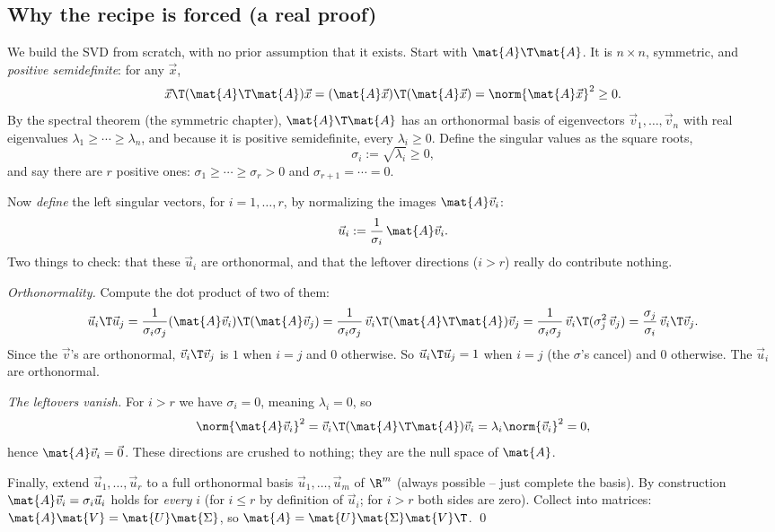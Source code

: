 \subsection{Why the recipe is forced (a real proof)}

We build the SVD from scratch, with no prior assumption that it exists. Start with
$\mat{A}\T\mat{A}$. It is $n\times n$, symmetric, and \emph{positive
semidefinite}: for any $\vec{x}$,
\[
  \vec{x}\T(\mat{A}\T\mat{A})\vec{x} = (\mat{A}\vec{x})\T(\mat{A}\vec{x})
  = \norm{\mat{A}\vec{x}}^2 \ge 0.
\]
By the spectral theorem (the symmetric chapter), $\mat{A}\T\mat{A}$ has an
orthonormal basis of eigenvectors $\vec{v}_1,\dots,\vec{v}_n$ with real
eigenvalues $\lambda_1 \ge \cdots \ge \lambda_n$, and because it is positive
semidefinite, every $\lambda_i \ge 0$. Define the singular values as the
square roots,
\[
  \sigma_i := \sqrt{\lambda_i} \ge 0,
\]
and say there are $r$ positive ones: $\sigma_1 \ge \cdots \ge \sigma_r > 0$ and
$\sigma_{r+1} = \cdots = 0$.

Now \emph{define} the left singular vectors, for $i = 1,\dots,r$, by normalizing
the images $\mat{A}\vec{v}_i$:
\[
  \vec{u}_i := \frac{1}{\sigma_i}\,\mat{A}\vec{v}_i.
\]
Two things to check: that these $\vec{u}_i$ are orthonormal, and that the leftover
directions ($i > r$) really do contribute nothing.

\emph{Orthonormality.} Compute the dot product of two of them:
\[
  \vec{u}_i\T\vec{u}_j
  = \frac{1}{\sigma_i\sigma_j}(\mat{A}\vec{v}_i)\T(\mat{A}\vec{v}_j)
  = \frac{1}{\sigma_i\sigma_j}\,\vec{v}_i\T(\mat{A}\T\mat{A})\vec{v}_j
  = \frac{1}{\sigma_i\sigma_j}\,\vec{v}_i\T(\sigma_j^2\,\vec{v}_j)
  = \frac{\sigma_j}{\sigma_i}\,\vec{v}_i\T\vec{v}_j.
\]
Since the $\vec{v}$'s are orthonormal, $\vec{v}_i\T\vec{v}_j$ is $1$ when $i=j$
and $0$ otherwise. So $\vec{u}_i\T\vec{u}_j = 1$ when $i=j$ (the $\sigma$'s
cancel) and $0$ otherwise. The $\vec{u}_i$ are orthonormal.

\emph{The leftovers vanish.} For $i > r$ we have $\sigma_i = 0$, meaning
$\lambda_i = 0$, so
\[
  \norm{\mat{A}\vec{v}_i}^2 = \vec{v}_i\T(\mat{A}\T\mat{A})\vec{v}_i
  = \lambda_i \norm{\vec{v}_i}^2 = 0,
\]
hence $\mat{A}\vec{v}_i = \vec{0}$. These directions are crushed to nothing; they
are the null space of $\mat{A}$.

Finally, extend $\vec{u}_1,\dots,\vec{u}_r$ to a full orthonormal basis
$\vec{u}_1,\dots,\vec{u}_m$ of $\R^m$ (always possible -- just complete the
basis). By construction $\mat{A}\vec{v}_i = \sigma_i\vec{u}_i$ holds for
\emph{every} $i$ (for $i \le r$ by definition of $\vec{u}_i$; for $i > r$ both
sides are zero). Collect into matrices: $\mat{A}\mat{V} = \mat{U}\mat{\Sigma}$, so
$\mat{A} = \mat{U}\mat{\Sigma}\mat{V}\T$. \qed

